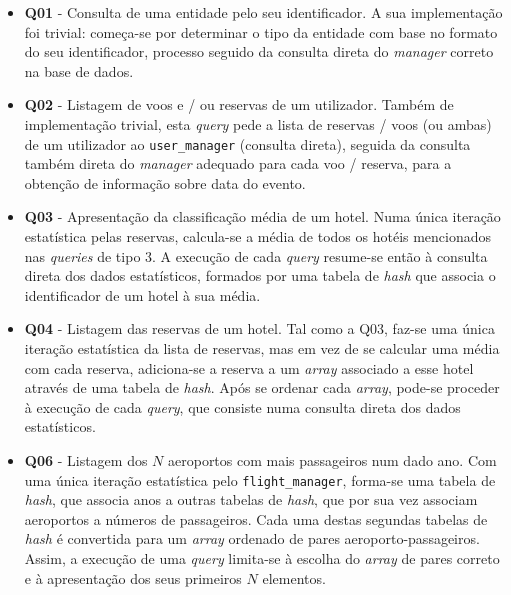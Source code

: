 \documentclass[12pt, a4paper]{article}
\begin{document}
\begin{itemize}
    \item \textbf{Q01} - Consulta de uma entidade pelo seu identificador. A sua implementação foi
                         trivial: começa-se por determinar o tipo da entidade com base no formato
                         do seu identificador, processo seguido da consulta direta do \emph{manager}
                         correto na base de dados.

    \item \textbf{Q02} - Listagem de voos e / ou reservas de um utilizador. Também de implementação
                         trivial, esta \emph{query} pede a lista de reservas / voos (ou ambas) de um
                         utilizador ao \texttt{user\_manager} (consulta direta), seguida da consulta
                         também direta do \emph{manager} adequado para cada voo / reserva, para a
                         obtenção de informação sobre data do evento.

    \item \textbf{Q03} - Apresentação da classificação média de um hotel. Numa única iteração
                         estatística pelas reservas, calcula-se a média de todos os hotéis
                         mencionados nas \emph{queries} de tipo 3. A execução de cada \emph{query}
                         resume-se então à consulta direta dos dados estatísticos, formados por uma
                         tabela de \emph{hash} que associa o identificador de um hotel à sua média.

    \item \textbf{Q04} - Listagem das reservas de um hotel. Tal como a Q03, faz-se uma única
                         iteração estatística da lista de reservas, mas em vez de se calcular uma
                         média com cada reserva, adiciona-se a reserva a um \emph{array} associado
                         a esse hotel através de uma tabela de \emph{hash}. Após se ordenar cada
                         \emph{array}, pode-se proceder à execução de cada \emph{query}, que
                         consiste numa consulta direta dos dados estatísticos.

    \item \textbf{Q06} - Listagem dos $N$ aeroportos com mais passageiros num dado ano. Com uma
                         única iteração estatística pelo \texttt{flight\_manager}, forma-se uma
                         tabela de \emph{hash}, que associa anos a outras tabelas de \emph{hash},
                         que por sua vez associam aeroportos a números de passageiros. Cada uma
                         destas segundas tabelas de \emph{hash} é convertida para um \emph{array}
                         ordenado de pares aeroporto-passageiros. Assim, a execução de uma
                         \emph{query} limita-se à escolha do \emph{array} de pares correto e à
                         apresentação dos seus primeiros $N$ elementos.


\end{itemize}
\end{document}
